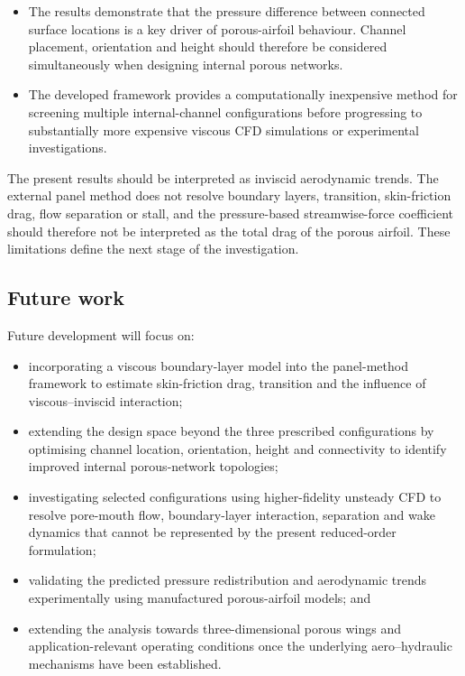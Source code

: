 \documentclass[a4paper,fleqn]{cas-dc}
\begin{document}
\begin{itemize}
		\item The results demonstrate that the pressure difference between
		connected surface locations is a key driver of porous-airfoil behaviour.
		Channel placement, orientation and height should therefore be considered
		simultaneously when designing internal porous networks.
		
		\item The developed framework provides a computationally inexpensive
		method for screening multiple internal-channel configurations before
		progressing to substantially more expensive viscous CFD simulations or
		experimental investigations.
		
	\end{itemize}
	
	The present results should be interpreted as inviscid aerodynamic trends.
	The external panel method does not resolve boundary layers, transition,
	skin-friction drag, flow separation or stall, and the pressure-based
	streamwise-force coefficient should therefore not be interpreted as the
	total drag of the porous airfoil. These limitations define the next stage
	of the investigation.
	
	\subsection{Future work}
	
	Future development will focus on:
	
	\begin{itemize}
		
		\item incorporating a viscous boundary-layer model into the panel-method
		framework to estimate skin-friction drag, transition and the influence
		of viscous--inviscid interaction;
		
		\item extending the design space beyond the three prescribed
		configurations by optimising channel location, orientation, height and
		connectivity to identify improved internal porous-network topologies;
		
		\item investigating selected configurations using higher-fidelity
		unsteady CFD to resolve pore-mouth flow, boundary-layer interaction,
		separation and wake dynamics that cannot be represented by the present
		reduced-order formulation;
		
		\item validating the predicted pressure redistribution and aerodynamic
		trends experimentally using manufactured porous-airfoil models; and
		
		\item extending the analysis towards three-dimensional porous wings and
		application-relevant operating conditions once the underlying
		aero--hydraulic mechanisms have been established.
		
	\end{itemize}
	
\end{document}

